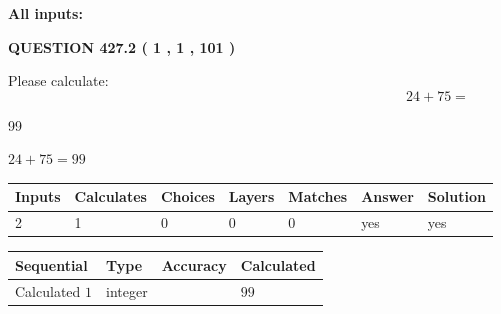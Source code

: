 \documentclass[12pt]{article}
\begin{document}
   
   
   
\noindent\vspace{0.1in}\hspace{-0.08in} {\textbf{\Large{All inputs: }}}
   
   
  
\vspace{0.2in}
  
{\textbf{\Large{QUESTION
427.2 
 ( 1 , 1 , 101 )
}}}
  
  
 
Please calculate:
\begin{equation}
24 +  %
75 = \nonumber
\end{equation}
 
 
 
\noindent{}
 
 

99
 
 
\noindent{}
 
 

 
 
 
\noindent{}
 
 

$ %
24 +  %
75=   %
99$
 
 
\noindent{}
 
 

 
   
   
   
   
\noindent\begin{tabular}{|l|l|l|l|l|l|l|}
 \hline
Inputs & Calculates & Choices & Layers & Matches & Answer & Solution \\ \hline
 2  & 
 1  & 
 0
  & 
 0  & 
 0  & 
  yes & 
  yes 
  \\ \hline
 \end{tabular}
   
   
   
   
\noindent{}
   
   
  
  
\noindent\begin{tabular}{|l|l|l|l|}
\hline
 Sequential & Type & Accuracy & Calculated \\ 
\hline
 
 
  Calculated $  1 $ & integer &  & 
  $ 99 $ 
 \\  \hline  
 \end{tabular}
   
\end{document}
